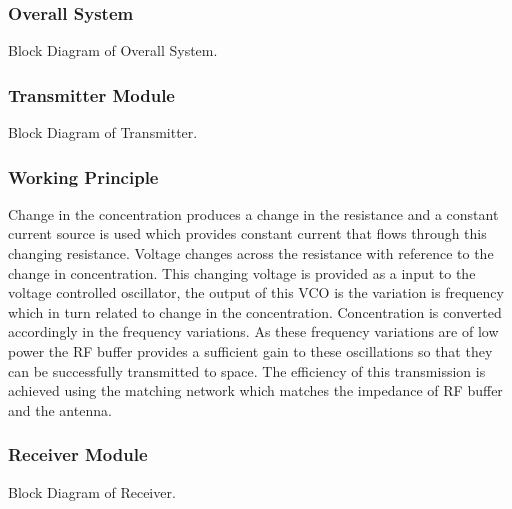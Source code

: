\documentclass{beamer}
\begin{document}
\begin{frame}
\frametitle{Overall System}Block Diagram of Overall System.
\end{frame}

\begin{frame}
\frametitle{Transmitter Module}Block Diagram of Transmitter.
\end{frame}

\begin{frame}
\frametitle{Working Principle}

Change in the concentration produces a change in the resistance and a constant current source is used which provides constant current that flows through this changing resistance.\newline
Voltage changes across the resistance with reference to the change in concentration.\newline
This changing voltage is provided as a input to the voltage controlled oscillator, the output of this VCO is the variation is frequency which in turn related to  change in the concentration.\newline
Concentration is converted accordingly in the frequency variations. As these frequency variations are of low power the RF buffer provides a sufficient gain to these oscillations so that they can be successfully transmitted to space.\newline
The efficiency of this transmission is achieved using the matching  network which matches the impedance of RF buffer and the antenna.
\end{frame}

\begin{frame}
\frametitle{Receiver Module}Block Diagram of Receiver.
\end{frame}




\end{document}
